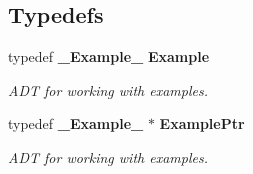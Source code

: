 \subsection*{Typedefs}
\begin{CompactItemize}
\item 
typedef {\bf \_\-Example\_\-} {\bf Example}
\begin{CompactList}\small\item\em ADT for working with examples. \item\end{CompactList}\item 
typedef {\bf \_\-Example\_\-} $\ast$ {\bf Example\-Ptr}
\begin{CompactList}\small\item\em ADT for working with examples. \item\end{CompactList}\end{CompactItemize}
